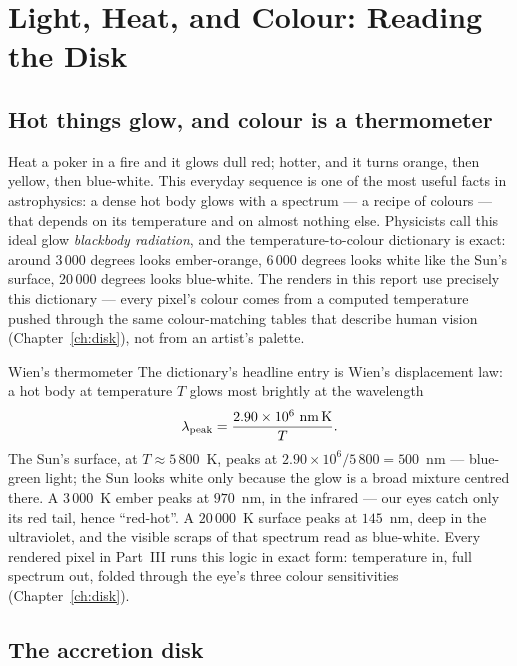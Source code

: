 \chapter{Light, Heat, and Colour: Reading the Disk}
\label{ch:f4}

\section{Hot things glow, and colour is a thermometer}

Heat a poker in a fire and it glows dull red; hotter, and it turns
orange, then yellow, then blue-white. This everyday sequence is one of
the most useful facts in astrophysics: a dense hot body glows with a
spectrum — a recipe of colours — that depends on its temperature and on
almost nothing else. Physicists call this ideal glow \emph{blackbody
radiation}, and the temperature-to-colour dictionary is exact: around
3\,000 degrees looks ember-orange, 6\,000 degrees looks white like the
Sun's surface, 20\,000 degrees looks blue-white. The renders in this
report use precisely this dictionary — every pixel's colour comes from a
computed temperature pushed through the same colour-matching tables that
describe human vision (Chapter~\ref{ch:disk}), not from an artist's
palette.

\begin{worked}{Wien's thermometer}
The dictionary's headline entry is Wien's displacement law: a hot body
at temperature $T$ glows most brightly at the wavelength
\[
\lambda_{\rm peak} = \frac{2.90\times10^{6}~{\rm nm\,K}}{T}.
\]
The Sun's surface, at $T \approx 5\,800$~K, peaks at
$2.90\times10^{6}/5\,800 = 500$~nm — blue-green light; the Sun looks
white only because the glow is a broad mixture centred there. A
$3\,000$~K ember peaks at $970$~nm, in the infrared — our eyes catch
only its red tail, hence ``red-hot''. A $20\,000$~K surface peaks at
$145$~nm, deep in the ultraviolet, and the visible scraps of that
spectrum read as blue-white. Every rendered pixel in Part~III runs this
logic in exact form: temperature in, full spectrum out, folded through
the eye's three colour sensitivities (Chapter~\ref{ch:disk}).
\end{worked}

\section{The accretion disk}

